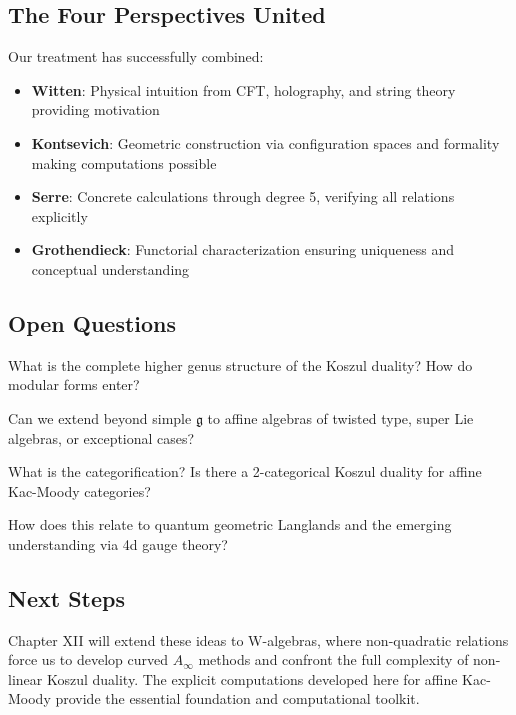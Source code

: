 \subsection{The Four Perspectives United}

Our treatment has successfully combined:
\begin{itemize}
\item \textbf{Witten}: Physical intuition from CFT, holography, and string theory providing motivation
\item \textbf{Kontsevich}: Geometric construction via configuration spaces and formality making computations possible
\item \textbf{Serre}: Concrete calculations through degree 5, verifying all relations explicitly
\item \textbf{Grothendieck}: Functorial characterization ensuring uniqueness and conceptual understanding
\end{itemize}

\subsection{Open Questions}

\begin{question}
What is the complete higher genus structure of the Koszul duality? How do modular forms enter?
\end{question}

\begin{question}
Can we extend beyond simple $\mathfrak{g}$ to affine algebras of twisted type, super Lie algebras, or exceptional cases?
\end{question}

\begin{question}
What is the categorification? Is there a 2-categorical Koszul duality for affine Kac-Moody categories?
\end{question}

\begin{question}
How does this relate to quantum geometric Langlands and the emerging understanding via 4d gauge theory?
\end{question}

\subsection{Next Steps}

Chapter XII will extend these ideas to W-algebras, where non-quadratic relations force us to develop curved $A_\infty$ methods and confront the full complexity of non-linear Koszul duality. The explicit computations developed here for affine Kac-Moody provide the essential foundation and computational toolkit.